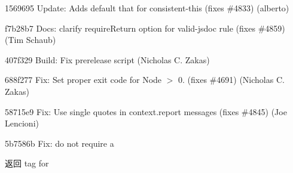 \begin{DoxyItemize}
\item 1569695 Update\+: Adds default \textquotesingle{}that\textquotesingle{} for consistent-\/this (fixes \#4833) (alberto)
\item f7b28b7 Docs\+: clarify {\ttfamily require\+Return} option for valid-\/jsdoc rule (fixes \#4859) (Tim Schaub)
\item 407f329 Build\+: Fix prerelease script (Nicholas C. Zakas)
\item 688f277 Fix\+: Set proper exit code for Node $>$ 0. (fixes \#4691) (Nicholas C. Zakas)
\item 58715e9 Fix\+: Use single quotes in context.\+report messages (fixes \#4845) (Joe Lencioni)
\item 5b7586b Fix\+: do not require a \begin{DoxyReturn}{返回}
tag for 
\end{DoxyReturn}

\end{DoxyItemize}